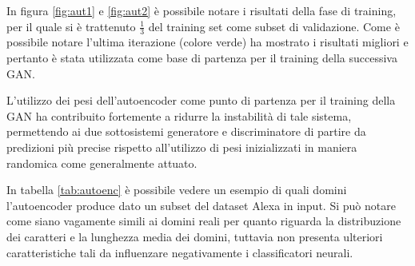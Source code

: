 In figura \ref{fig:aut1} e \ref{fig:aut2} è possibile notare i risultati della fase di training, per il quale si è trattenuto $\frac{1}{3}$ del training set come subset di validazione. Come è possibile notare l'ultima iterazione (colore verde) ha mostrato i risultati migliori e pertanto è stata utilizzata come base di partenza per il training della successiva GAN. 

L'utilizzo dei pesi dell'autoencoder come punto di partenza per il training della GAN ha contribuito fortemente a ridurre la instabilità di tale sistema, permettendo ai due sottosistemi generatore e discriminatore di partire da predizioni più precise rispetto all'utilizzo di pesi inizializzati in maniera randomica come generalmente attuato.

In tabella \ref{tab:autoenc} è possibile vedere un esempio di quali domini l'autoencoder produce dato un subset del dataset Alexa in input. Si può notare come siano vagamente simili ai domini reali per quanto riguarda la distribuzione dei caratteri e la lunghezza media dei domini, tuttavia non presenta ulteriori caratteristiche tali da influenzare negativamente i classificatori neurali.

